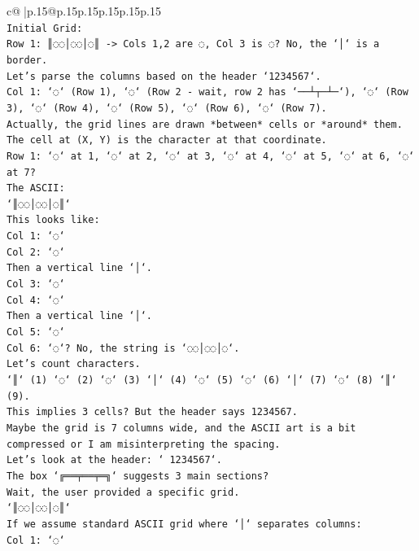 \documentclass{article}
\begin{document}
{\begin{supertabular}{c@{$\;$}|p{.15\linewidth}@{}p{.15\linewidth}p{.15\linewidth}p{.15\linewidth}p{.15\linewidth}p{.15\linewidth}}
{{{\\ 
\texttt{Initial Grid:} \\
\texttt{Row 1: ║◌◌│◌◌│◌║ {-}> Cols 1,2 are ◌, Col 3 is ◌? No, the `│` is a border.} \\
\texttt{Let's parse the columns based on the header `1234567`.} \\
\texttt{Col 1: `◌` (Row 1), `◌` (Row 2 {-} wait, row 2 has `──┴┬─┴─`), `◌` (Row 3), `◌` (Row 4), `◌` (Row 5), `◌` (Row 6), `◌` (Row 7).} \\
\texttt{Actually, the grid lines are drawn *between* cells or *around* them.} \\
\texttt{The cell at (X, Y) is the character at that coordinate.} \\
\texttt{Row 1: `◌` at 1, `◌` at 2, `◌` at 3, `◌` at 4, `◌` at 5, `◌` at 6, `◌` at 7?} \\
\texttt{The ASCII:} \\
\texttt{`║◌◌│◌◌│◌║`} \\
\texttt{This looks like:} \\
\texttt{Col 1: `◌`} \\
\texttt{Col 2: `◌`} \\
\texttt{Then a vertical line `│`.} \\
\texttt{Col 3: `◌`} \\
\texttt{Col 4: `◌`} \\
\texttt{Then a vertical line `│`.} \\
\texttt{Col 5: `◌`} \\
\texttt{Col 6: `◌`? No, the string is `◌◌│◌◌│◌`.} \\
\texttt{Let's count characters.} \\
\texttt{`║` (1) `◌` (2) `◌` (3) `│` (4) `◌` (5) `◌` (6) `│` (7) `◌` (8) `║` (9).} \\
\texttt{This implies 3 cells? But the header says 1234567.} \\
\texttt{Maybe the grid is 7 columns wide, and the ASCII art is a bit compressed or I am misinterpreting the spacing.} \\
\texttt{Let's look at the header: ` 1234567`.} \\
\texttt{The box `╔══╤══╤═╗` suggests 3 main sections?} \\
\texttt{Wait, the user provided a specific grid.} \\
\texttt{`║◌◌│◌◌│◌║`} \\
\texttt{If we assume standard ASCII grid where `│` separates columns:} \\
\texttt{Col 1: `◌`} \\
}}}
\end{supertabular}}
\end{document}
